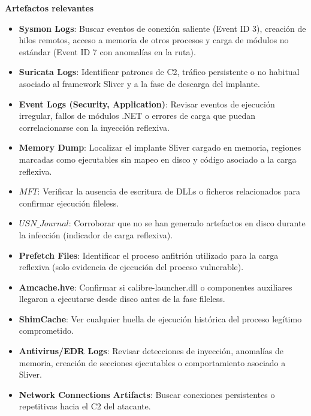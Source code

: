 \textbf{Artefactos relevantes}
\begin{itemize}
    \item \textbf{Sysmon Logs}: Buscar eventos de conexión saliente (Event ID 3), creación de hilos remotos, acceso a memoria de otros procesos y carga de módulos no estándar (Event ID 7 con anomalías en la ruta).
    \item \textbf{Suricata Logs}: Identificar patrones de C2, tráfico persistente o no habitual asociado al framework Sliver y a la fase de descarga del implante.
    \item \textbf{Event Logs (Security, Application)}: Revisar eventos de ejecución irregular, fallos de módulos .NET o errores de carga que puedan correlacionarse con la inyección reflexiva.
    \item \textbf{Memory Dump}: Localizar el implante Sliver cargado en memoria, regiones marcadas como ejecutables sin mapeo en disco y código asociado a la carga reflexiva.
    \item \textbf{$MFT$}: Verificar la ausencia de escritura de DLLs o ficheros relacionados para confirmar ejecución fileless.
    \item \textbf{$USN\_Journal$}: Corroborar que no se han generado artefactos en disco durante la infección (indicador de carga reflexiva).
    \item \textbf{Prefetch Files}: Identificar el proceso anfitrión utilizado para la carga reflexiva (solo evidencia de ejecución del proceso vulnerable).
    \item \textbf{Amcache.hve}: Confirmar si calibre-launcher.dll o componentes auxiliares llegaron a ejecutarse desde disco antes de la fase fileless.
    \item \textbf{ShimCache}: Ver cualquier huella de ejecución histórica del proceso legítimo comprometido.
    \item \textbf{Antivirus/EDR Logs}: Revisar detecciones de inyección, anomalías de memoria, creación de secciones ejecutables o comportamiento asociado a Sliver.
    \item \textbf{Network Connections Artifacts}: Buscar conexiones persistentes o repetitivas hacia el C2 del atacante.
\end{itemize}

